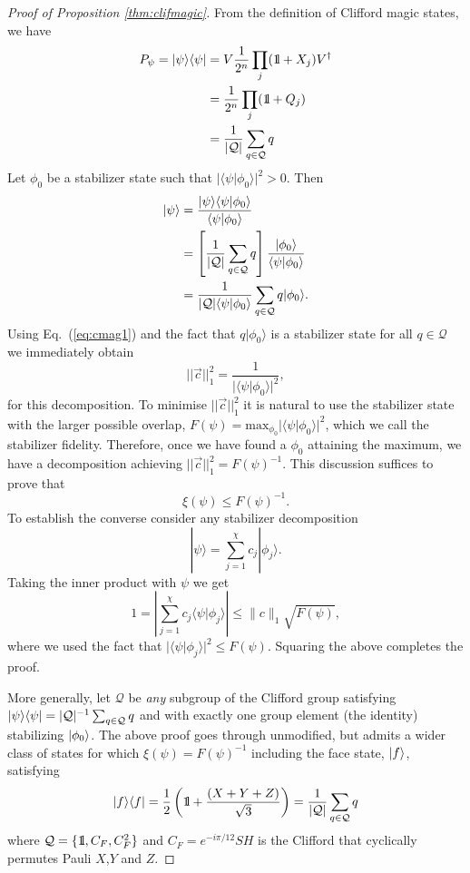 \begin{proof}[Proof of Proposition \ref{thm:clifmagic}]
From the definition of Clifford magic states, we have
\begin{align}
P_\psi = |\psi\rangle\langle\psi| & = V \frac{1}{2^n} \prod_j (\id + X_j) V^\dagger \\ \nonumber
& = \frac{1}{2^n} \prod_j (\id + Q_j ) \\ \nonumber
& = \frac{1}{| \mathcal{Q} |} \sum_{q \in \mathcal{Q}} q 
\end{align}
Let $\phi_0$ be a stabilizer state such that $|\langle \psi|\phi_0\rangle|^2>0$. Then
\begin{align}
|\psi\rangle & = \frac{\vert\psi\rangle\langle \psi\vert \phi_0\rangle}{\langle \psi\vert \phi_0\rangle}  \label{eq:cmag1}\\ \nonumber
& = \left[ \frac{1}{|\mathcal{Q}|} \sum_{q\in \mathcal{Q}} q \right]  \frac{\vert\phi_0\rangle}{\langle \psi\vert \phi_0\rangle} \\ \nonumber
& = \frac{1}{|\mathcal{Q}|\langle \psi|\phi_0\rangle}\sum_{q\in \mathcal{Q}}q|\phi_0\rangle.
\end{align}
Using Eq.~(\ref{eq:cmag1}) and the fact that $q|\phi_0\rangle$ is a stabilizer state for all $q\in \mathcal{Q}$ we immediately obtain
\[
|| \vec{c} ||_1^2 = \frac{1}{|\langle \psi|\phi_0\rangle|^2},
\]
for this decomposition.  To minimise $|| \vec{c} ||_1^2$ it is natural to use the stabilizer state with the larger possible overlap, $F(\psi)= \mathrm{max}_{\phi_0}|\langle \psi|\phi_0\rangle|^2$, which we call the stabilizer fidelity.  Therefore, once we have found a $\phi_0$ attaining the maximum, we have a decomposition achieving $|| \vec{c} ||_1^2 =  F(\psi)^{-1}$.   This discussion suffices to prove that 
\[
\xi(\psi) \leq F(\psi)^{-1}.
\]
To establish the converse consider any stabilizer decomposition 
\[
|\psi\rangle=\sum_{j=1}^{\chi}c_j |\phi_j\rangle.
\]
Taking the inner product with $\psi$ we get
\[
1=\left|\sum_{j=1}^{\chi}c_j \langle \psi |\phi_j\rangle \right|\leq \|c\|_1 \sqrt{F(\psi)},
\]
where we used the fact that $|\langle \psi|\phi_j\rangle|^2\leq F(\psi)$. Squaring the above completes the proof.

More generally, let $\mathcal{Q}$ be \emph{any} subgroup of the Clifford group satisfying $\vert \psi \rangle \langle \psi \vert=|\mathcal{Q}|^{-1}\sum_{q\in\mathcal{Q}} q$ and with exactly one group element (the identity) stabilizing $\vert\phi_0\rangle$. The above proof goes through unmodified, but admits a wider class of states for which $\xi(\psi)=F(\psi)^{-1}$ including the face state, $\vert f\rangle$, satisfying
\begin{align}
\kb{f}{f}=\frac{1}{2}\left(\id+\frac{(X+Y+Z)}{\sqrt{3}}\right)=\frac{1}{|\mathcal{Q}|}\sum_{q\in\mathcal{Q}} q
\end{align}
where $\mathcal{Q}=\{\id,C_F,C_F^2\}$ and $C_F=e^{-i \pi /12}SH$ is the Clifford that cyclically permutes Pauli $X$,$Y$ and $Z$. 
\end{proof}
